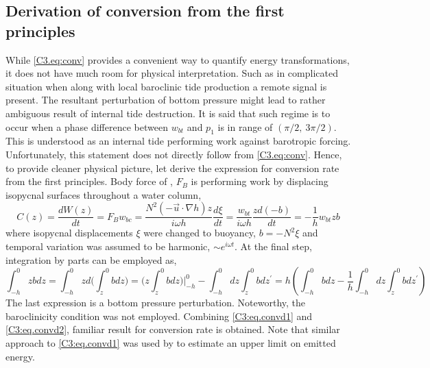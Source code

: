 \documentclass[12pt]{article}
\begin{document}
\subsection{Derivation of conversion from the first principles}
\label{C3.app:conv}
While \eqref{C3.eq:conv} provides a convenient way to quantify energy transformations, it does 
not have much room for physical interpretation. Such as in complicated situation when along with 
local baroclinic tide production a remote signal is present. The resultant perturbation of bottom 
pressure might lead to rather ambiguous result of internal tide destruction. It is said that such 
regime is to occur when a phase difference between $w_{bt}$ and $p_{1}$ is in range of 
$(\pi/2,~3\pi/2)$. This is understood as an internal tide performing work against barotropic 
forcing. Unfortunately, this statement does not directly follow from \eqref{C3.eq:conv}. Hence, to 
provide cleaner physical picture, let derive the expression for conversion rate from the first 
principles. Body force of \citep{baines1982internal}, $F_B$ is performing work by displacing 
isopycnal 
surfaces throughout a water column,
\begin{equation}
\label{C3:eq.convd1}
C(z) = \frac{dW(z)}{dt} = F_{B} w_{bc} = \frac{N^2 (-\vec{u} \cdot \nabla h) z}{i \omega h} 
\frac{d 
	\xi}{dt} = \frac{w_{bt}}{i \omega h} \frac{z d(-b)}{dt} = -\frac{1}{h} w_{bt} zb
\end{equation}
where isopycnal displacements $\xi$ were changed to buoyancy, $b = -N^2 \xi$ and temporal 
variation 
was assumed to be harmonic, $\sim e^{i \omega t}$. At the final step, integration by parts can be 
employed as,
\begin{equation}
\label{C3:eq.convd2}
\int_{-h}^{0} z b dz = \int_{-h}^{0} z d \big( \int^0_{z} b dz \big) = \big( z \int^0_{z} b dz 
\big)\big|_{-h}^0 - \int_{-h}^{0} dz \int_{z}^{0} b dz^{\prime} = h (\int_{-h}^{0}b dz - 
\frac{1}{h} \int_{-h}^{0} dz \int_{z}^{0} b dz^{\prime})
\end{equation}
The last expression is a bottom pressure perturbation. Noteworthy, the baroclinicity condition was 
not employed. Combining \eqref{C3:eq.convd1} and \eqref{C3:eq.convd2}, familiar result 
for conversion rate is obtained. Note that similar approach to \eqref{C3:eq.convd1} was used 
by \citep{nash2006structure} to estimate an upper limit on emitted energy.\\
\end{document}
